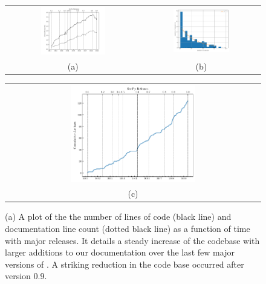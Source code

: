 \begin{figure}
\begin{tabular}{cc}
  \includegraphics[width=0.5\textwidth]{figures/fig_loc_vs_time.pdf} &
  \includegraphics[width=0.5\textwidth]{figures/busfactor_plot.pdf} \\
(a) & (b)  \\
\end{tabular}
\begin{tabular}{c}
  \includegraphics[width=0.5\textwidth]{figures/cumulative_authors.pdf} \\
(c)  \\
\end{tabular}
\caption{
	(a) A plot of the the number of lines of code (black line) and documentation line count (dotted black line) as a function of time with major releases.
	It details a steady increase of the \sunpypkg codebase with larger additions to our documentation over the last few major versions of \sunpypkg.
	A striking reduction in the code base occurred after version 0.9.
}
\end{figure}
